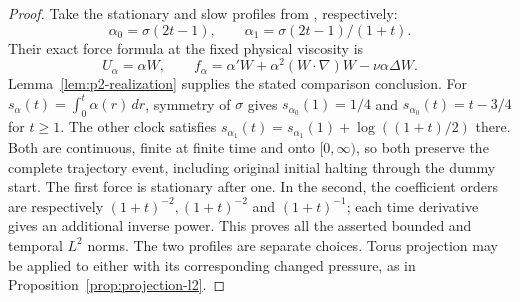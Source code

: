 \begin{proof}
Take the stationary and slow profiles from
\cite[Section~5 and Proposition~6.1]{OpenAI379StationaryA2}, respectively:
\begin{equation}\label{bc:input-offset-profiles}
 \alpha_0=\sigma(2t-1),\qquad \alpha_1=\sigma(2t-1)/(1+t).
\end{equation}
Their exact force formula at the fixed physical viscosity is
\begin{equation}\label{bc:input-offset-force}
 U_\alpha=\alpha W,\qquad
 f_\alpha=\alpha'W+\alpha^2(W\cdot\nabla)W-\nu\alpha\Delta W.
\end{equation}
Lemma~\ref{lem:p2-realization} supplies the stated comparison conclusion.
For $s_\alpha(t)=\int_0^t\alpha(r)\,dr$, symmetry of $\sigma$ gives
$s_{\alpha_0}(1)=1/4$ and $s_{\alpha_0}(t)=t-3/4$ for $t\ge1$.
The other clock satisfies
$s_{\alpha_1}(t)=s_{\alpha_1}(1)+\log((1+t)/2)$ there. Both are
continuous, finite at finite time and onto $[0,\infty)$, so both preserve
the complete trajectory event, including original initial halting through
the dummy start. The first force is stationary after one. In the second,
the coefficient orders are respectively $(1+t)^{-2},(1+t)^{-2}$ and
$(1+t)^{-1}$; each time derivative gives an additional inverse power.
This proves all the asserted bounded and temporal $L^2$ norms. The two
profiles are separate choices. Torus projection may be applied to either
with its corresponding changed pressure, as in
Proposition~\ref{prop:projection-l2}.
\end{proof}
